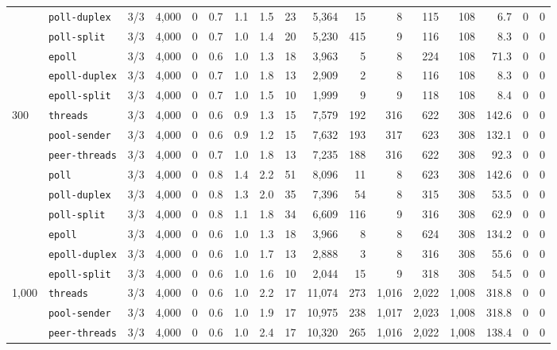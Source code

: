 \begin{longtable}{@{}llrrrrrrrrrrrrrrr@{}}
 & \texttt{poll-duplex} & 3/3 & 4{,}000 & 0 & 0.7 & 1.1 & 1.5 & 23 & 5{,}364 & 15 & 8 & 115 & 108 & 6.7 & 0 & 0 \\
 & \texttt{poll-split} & 3/3 & 4{,}000 & 0 & 0.7 & 1.0 & 1.4 & 20 & 5{,}230 & 415 & 9 & 116 & 108 & 8.3 & 0 & 0 \\
 & \texttt{epoll} & 3/3 & 4{,}000 & 0 & 0.6 & 1.0 & 1.3 & 18 & 3{,}963 & 5 & 8 & 224 & 108 & 71.3 & 0 & 0 \\
 & \texttt{epoll-duplex} & 3/3 & 4{,}000 & 0 & 0.7 & 1.0 & 1.8 & 13 & 2{,}909 & 2 & 8 & 116 & 108 & 8.3 & 0 & 0 \\
 & \texttt{epoll-split} & 3/3 & 4{,}000 & 0 & 0.7 & 1.0 & 1.5 & 10 & 1{,}999 & 9 & 9 & 118 & 108 & 8.4 & 0 & 0 \\
\midrule
300 & \texttt{threads} & 3/3 & 4{,}000 & 0 & 0.6 & 0.9 & 1.3 & 15 & 7{,}579 & 192 & 316 & 622 & 308 & 142.6 & 0 & 0 \\
 & \texttt{pool-sender} & 3/3 & 4{,}000 & 0 & 0.6 & 0.9 & 1.2 & 15 & 7{,}632 & 193 & 317 & 623 & 308 & 132.1 & 0 & 0 \\
 & \texttt{peer-threads} & 3/3 & 4{,}000 & 0 & 0.7 & 1.0 & 1.8 & 13 & 7{,}235 & 188 & 316 & 622 & 308 & 92.3 & 0 & 0 \\
 & \texttt{poll} & 3/3 & 4{,}000 & 0 & 0.8 & 1.4 & 2.2 & 51 & 8{,}096 & 11 & 8 & 623 & 308 & 142.6 & 0 & 0 \\
 & \texttt{poll-duplex} & 3/3 & 4{,}000 & 0 & 0.8 & 1.3 & 2.0 & 35 & 7{,}396 & 54 & 8 & 315 & 308 & 53.5 & 0 & 0 \\
 & \texttt{poll-split} & 3/3 & 4{,}000 & 0 & 0.8 & 1.1 & 1.8 & 34 & 6{,}609 & 116 & 9 & 316 & 308 & 62.9 & 0 & 0 \\
 & \texttt{epoll} & 3/3 & 4{,}000 & 0 & 0.6 & 1.0 & 1.3 & 18 & 3{,}966 & 8 & 8 & 624 & 308 & 134.2 & 0 & 0 \\
 & \texttt{epoll-duplex} & 3/3 & 4{,}000 & 0 & 0.6 & 1.0 & 1.7 & 13 & 2{,}888 & 3 & 8 & 316 & 308 & 55.6 & 0 & 0 \\
 & \texttt{epoll-split} & 3/3 & 4{,}000 & 0 & 0.6 & 1.0 & 1.6 & 10 & 2{,}044 & 15 & 9 & 318 & 308 & 54.5 & 0 & 0 \\
\midrule
1{,}000 & \texttt{threads} & 3/3 & 4{,}000 & 0 & 0.6 & 1.0 & 2.2 & 17 & 11{,}074 & 273 & 1{,}016 & 2{,}022 & 1{,}008 & 318.8 & 0 & 0 \\
 & \texttt{pool-sender} & 3/3 & 4{,}000 & 0 & 0.6 & 1.0 & 1.9 & 17 & 10{,}975 & 238 & 1{,}017 & 2{,}023 & 1{,}008 & 318.8 & 0 & 0 \\
 & \texttt{peer-threads} & 3/3 & 4{,}000 & 0 & 0.6 & 1.0 & 2.4 & 17 & 10{,}320 & 265 & 1{,}016 & 2{,}022 & 1{,}008 & 138.4 & 0 & 0 \\

\end{longtable}
